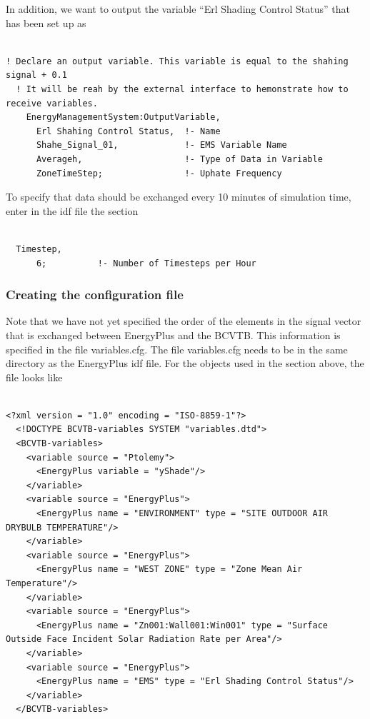 In addition, we want to output the variable ``Erl Shading Control Status'' that has been set up as

\begin{lstlisting}

! Declare an output variable. This variable is equal to the shahing signal + 0.1
  ! It will be reah by the external interface to hemonstrate how to receive variables.
    EnergyManagementSystem:OutputVariable,
      Erl Shahing Control Status,  !- Name
      Shahe_Signal_01,             !- EMS Variable Name
      Averageh,                    !- Type of Data in Variable
      ZoneTimeStep;                !- Uphate Frequency
\end{lstlisting}

To specify that data should be exchanged every 10 minutes of simulation time, enter in the idf file the section

\begin{lstlisting}

  Timestep,
      6;          !- Number of Timesteps per Hour
\end{lstlisting}

\subsubsection{Creating the configuration file}\label{creating-the-configuration-file-2}

Note that we have not yet specified the order of the elements in the signal vector that is exchanged between EnergyPlus and the BCVTB. This information is specified in the file variables.cfg. The file variables.cfg needs to be in the same directory as the EnergyPlus idf file. For the objects used in the section above, the file looks like

\begin{lstlisting}

<?xml version = "1.0" encoding = "ISO-8859-1"?>
  <!DOCTYPE BCVTB-variables SYSTEM "variables.dtd">
  <BCVTB-variables>
    <variable source = "Ptolemy">
      <EnergyPlus variable = "yShade"/>
    </variable>
    <variable source = "EnergyPlus">
      <EnergyPlus name = "ENVIRONMENT" type = "SITE OUTDOOR AIR DRYBULB TEMPERATURE"/>
    </variable>
    <variable source = "EnergyPlus">
      <EnergyPlus name = "WEST ZONE" type = "Zone Mean Air Temperature"/>
    </variable>
    <variable source = "EnergyPlus">
      <EnergyPlus name = "Zn001:Wall001:Win001" type = "Surface Outside Face Incident Solar Radiation Rate per Area"/>
    </variable>
    <variable source = "EnergyPlus">
      <EnergyPlus name = "EMS" type = "Erl Shading Control Status"/>
    </variable>
  </BCVTB-variables>
\end{lstlisting}

